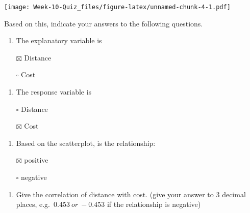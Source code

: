\documentclass[
]{article}
\newenvironment{Shaded}{\begin{snugshade}}{\end{snugshade}}
\newcommand{\DecValTok}[1]{\textcolor[rgb]{0.00,0.00,0.81}{#1}}
\newcommand{\FunctionTok}[1]{\textcolor[rgb]{0.00,0.00,0.00}{#1}}
\newcommand{\NormalTok}[1]{#1}
\newcommand{\SpecialCharTok}[1]{\textcolor[rgb]{0.00,0.00,0.00}{#1}}
\providecommand{\tightlist}{%
  \setlength{\itemsep}{0pt}\setlength{\parskip}{0pt}}
\begin{document}
\texttt{[image: Week-10-Quiz\_files/figure-latex/unnamed-chunk-4-1.pdf]}

Based on this, indicate your answers to the following questions.

\begin{enumerate}
\def\labelenumi{\alph{enumi}.}
\tightlist
\item
  The explanatory variable is
\end{enumerate}

\begin{itemize}
\tightlist
\item[$\boxtimes$]
  Distance
\item[$\square$]
  Cost
\end{itemize}

\begin{enumerate}
\def\labelenumi{\alph{enumi}.}
\setcounter{enumi}{1}
\tightlist
\item
  The response variable is
\end{enumerate}

\begin{itemize}
\tightlist
\item[$\square$]
  Distance
\item[$\boxtimes$]
  Cost
\end{itemize}

\begin{enumerate}
\def\labelenumi{\alph{enumi}.}
\setcounter{enumi}{2}
\tightlist
\item
  Based on the scatterplot, is the relationship:
\end{enumerate}

\begin{itemize}
\tightlist
\item[$\boxtimes$]
  positive
\item[$\square$]
  negative
\end{itemize}

\begin{enumerate}
\def\labelenumi{\alph{enumi}.}
\setcounter{enumi}{3}
\tightlist
\item
  Give the correlation of distance with cost. (give your answer to 3
  decimal places, e.g.~\(0.453\ or\ -0.453\) if the relationship is
  negative)
\end{enumerate}

\begin{Shaded}
\end{Shaded}
\end{document}
